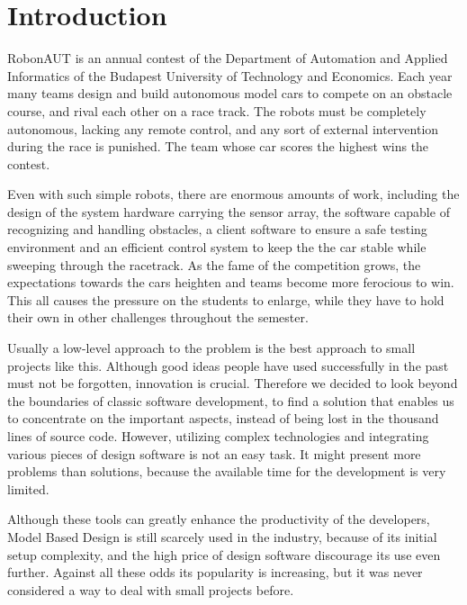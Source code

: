 \section{Introduction}
\label{sec:Introduction}


RobonAUT is an annual contest of the Department of Automation and Applied Informatics of the Budapest University of Technology and Economics. Each year many teams design and build autonomous model cars to compete on an obstacle course, and rival each other on a race track. The robots must be completely autonomous, lacking any remote control, and any sort of external intervention during the race is punished. The team whose car scores the highest wins the contest\cite{rules}.


Even with such simple robots, there are enormous amounts of work, including the design of the system hardware carrying the sensor array, the software capable of recognizing and handling obstacles, a client software to ensure a safe testing environment and an efficient control system to keep the the car stable while sweeping through the racetrack\cite{robonauttdk}. As the fame of the competition grows, the expectations towards the cars heighten and teams become more ferocious to win. This all causes the pressure on the students to enlarge, while they have to hold their own in other challenges throughout the semester.


Usually a low-level approach to the problem is the best approach to small projects like this. Although good ideas people have used successfully in the past must not be forgotten, innovation is crucial. Therefore we decided to look beyond the boundaries of classic software development, to find a solution that enables us to concentrate on the important aspects, instead of being lost in the thousand lines of source code. However, utilizing complex technologies and integrating various pieces of design software is not an easy task. It might present more problems than solutions, because the available time for the development is very limited.


Although these tools can greatly enhance the productivity of the developers, Model Based Design is still scarcely used in the industry, because of its initial setup complexity, and the high price of design software discourage its use even further. Against all these odds its popularity is increasing, but it was never considered a way to deal with small projects before.

